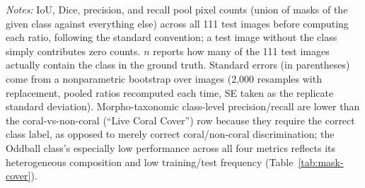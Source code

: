 \documentclass[11pt]{elsarticle}
\begin{document}
\begin{table}[htbp]
\centering
\caption{Pixel-level IoU, Dice, precision, and recall by taxonomic class, pooled across the 111-image held-out test set ($n$ = images whose ground truth contains the class; see notes).}
\label{tab:iou-dice-taxonomy}
\begin{tablenotes}
\item \emph{Notes:} IoU, Dice, precision, and recall pool pixel counts (union of masks of the given class against everything else) across all 111 test images before computing each ratio, following the standard convention; a test image without the class simply contributes zero counts. $n$ reports how many of the 111 test images actually contain the class in the ground truth. Standard errors (in parentheses) come from a nonparametric bootstrap over images (2,000 resamples with replacement, pooled ratios recomputed each time, SE taken as the replicate standard deviation). Morpho-taxonomic class-level precision/recall are lower than the coral-vs-non-coral (``Live Coral Cover'') row because they require the correct class label, as opposed to merely correct coral/non-coral discrimination; the Oddball class's especially low performance across all four metrics reflects its heterogeneous composition and low training/test frequency (Table~\ref{tab:mask-cover}).
\end{tablenotes}
\end{table}
\end{document}
